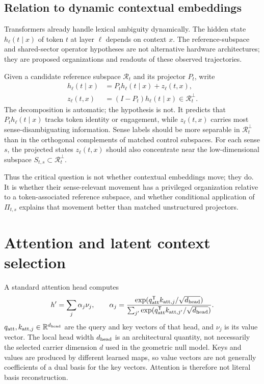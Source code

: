\documentclass[
  aps,
  reprint,
  superscriptaddress,
  floatfix,
  nofootinbib,
  longbibliography
]{revtex4-2}
\newcommand{\R}{\mathbb{R}}
\newcommand{\T}{^{\mathsf{T}}}
\begin{document}
\subsection{Relation to dynamic contextual embeddings}
\label{sec:dynamic}

Transformers already handle lexical ambiguity dynamically. The hidden state
$h_\ell(t\mid x)$ of token $t$ at layer $\ell$ depends on context $x$.
The reference-subspace and shared-sector operator hypotheses are not
alternative hardware architectures; they are proposed organizations and
readouts of these observed trajectories.

Given a candidate reference subspace $\mathcal R_t$ and its projector $P_t$,
write
%
\begin{align}
\label{eq:layer-decomp}
h_\ell(t\mid x)
&=P_t h_\ell(t\mid x)+z_\ell(t,x),\\
z_\ell(t,x)&=(I-P_t)h_\ell(t\mid x)
\in\mathcal R_t^\perp.\nonumber
\end{align}
%
The decomposition is automatic; the hypothesis is not. It predicts that
$P_t h_\ell(t\mid x)$ tracks token identity or engagement, while
$z_\ell(t,x)$ carries most sense-disambiguating information. Sense labels
should be more separable in $\mathcal R_t^\perp$ than in the orthogonal
complements of matched control subspaces. For each sense $s$, the projected
states $z_\ell(t,x)$ should also concentrate near the low-dimensional
subspace $S_{t,s}\subset\mathcal R_t^\perp$.

Thus the critical question is not whether contextual embeddings move; they
do. It is whether their sense-relevant movement has a privileged organization
relative to a token-associated reference subspace, and whether conditional
application of $\Pi_{t,s}$ explains that movement better than matched
unstructured projectors.

\section{Attention and latent context selection}
\label{sec:attention}

A standard attention head computes
%
\begin{equation}
\label{eq:attention}
h'=\sum_j\alpha_j\nu_j,
\qquad
\alpha_j=
\frac{\exp(q_{\rm att}\T k_{{\rm att},j}/\sqrt{d_{\rm head}})}
{\sum_{j'}\exp(q_{\rm att}\T k_{{\rm att},j'}/\sqrt{d_{\rm head}})} .
\end{equation}
%
$q_{\rm att},k_{{\rm att},j}\in\R^{d_{\rm head}}$ are the query and key
vectors of that head, and $\nu_j$ is its value vector.  The local head width
$d_{\rm head}$ is an architectural
quantity, not necessarily the selected carrier dimension $d$ used in the
geometric null model.
Keys and values are produced by different learned maps, so value vectors
are not generally coefficients of a dual basis for the key vectors.
Attention is therefore not literal basis reconstruction.
\end{document}
